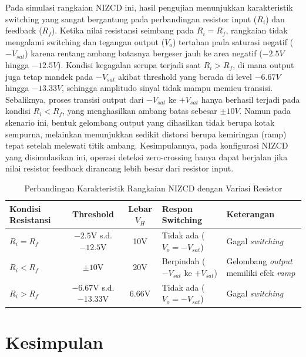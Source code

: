 \documentclass{article}
\begin{document}
Pada simulasi rangkaian NIZCD ini, hasil pengujian menunjukkan karakteristik switching yang sangat bergantung pada perbandingan resistor input ($R_i$) dan feedback ($R_f$). Ketika nilai resistansi seimbang pada $R_i = R_f$, rangkaian tidak mengalami switching dan tegangan output ($V_o$) tertahan pada saturasi negatif ($-V_{sat}$) karena rentang ambang batasnya bergeser jauh ke area negatif ($-2.5V$ hingga $-12.5V$). Kondisi kegagalan serupa terjadi saat $R_i > R_f$, di mana output juga tetap mandek pada $-V_{sat}$ akibat threshold yang berada di level $-6.67V$ hingga $-13.33V$, sehingga amplitudo sinyal tidak mampu memicu transisi. Sebaliknya, proses transisi output dari $-V_{sat}$ ke $+V_{sat}$ hanya berhasil terjadi pada kondisi $R_i < R_f$, yang menghasilkan ambang batas sebesar $\pm 10V$. Namun pada skenario ini, bentuk gelombang output yang dihasilkan tidak berupa kotak sempurna, melainkan menunjukkan sedikit distorsi berupa kemiringan (ramp) tepat setelah melewati titik ambang. Kesimpulannya, pada konfigurasi NIZCD yang disimulasikan ini, operasi deteksi zero-crossing hanya dapat berjalan jika nilai resistor feedback dirancang lebih besar dari resistor input.

\begin{table}[H]
\centering
\caption{Perbandingan Karakteristik Rangkaian NIZCD dengan Variasi Resistor}
\label{tab:perbandingan_nizcd}
\begin{tabularx}{\textwidth}{|l|c|c|X|X|}
\hline
\textbf{Kondisi Resistansi} & \textbf{Threshold} & \textbf{Lebar} $V_H$ & \textbf{Respon Switching} & \textbf{Keterangan} \\ \hline
$R_i = R_f$ & $-2.5$V s.d. $-12.5$V & 10V & Tidak ada ($V_o = -V_{sat}$) & Gagal \textit{switching} \\ \hline
$R_i < R_f$ & $\pm 10$V & 20V & Berpindah ($-V_{sat}$ ke $+V_{sat}$) & Gelombang \textit{output} memiliki efek \textit{ramp} \\ \hline
$R_i > R_f$ & $-6.67$V s.d. $-13.33$V & 6.66V & Tidak ada ($V_o = -V_{sat}$) & Gagal \textit{switching} \\ \hline
\end{tabularx}
\end{table}

\section*{Kesimpulan}
\end{document}
